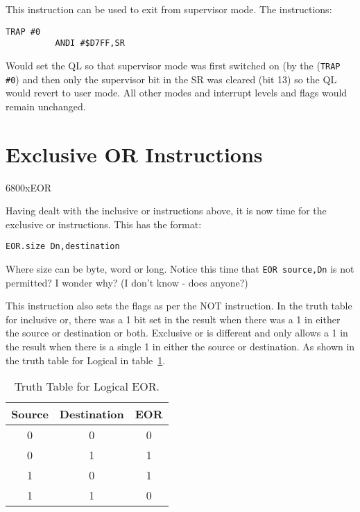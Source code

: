 This instruction can be used to exit from supervisor mode. The
    instructions:

\begin{lstlisting}[firstnumber=1,]
          TRAP #0
          ANDI #$D7FF,SR
\end{lstlisting}

Would set the QL so that supervisor mode was first switched on (by
    the (\lstinline{TRAP #0}) and then only the supervisor bit in the SR was cleared (bit
    13) so the QL would revert to user mode. All other modes and interrupt
    levels and flags would remain unchanged.

\section{Exclusive OR Instructions}\mc6800x{EOR}
\label{ch4-eor}%

Having dealt with the inclusive or instructions above, it is now
    time for the exclusive or instructions. This has the format:

\begin{lstlisting}[firstnumber=1,]
          EOR.size Dn,destination
\end{lstlisting}

Where size can be byte, word or long. Notice this time that \lstinline{EOR source,Dn} is not permitted? I wonder why? (I don't know -{} does anyone?)

This instruction also sets the flags as per the NOT instruction. In
    the truth table for inclusive or, there was a 1 bit set in the result when
    there was a 1 in either the source or destination or both. Exclusive or is
    different and only allows a 1 in the result when there is a single 1 in
    either the source or destination. As shown in the truth table for Logical  in table~\ref{tab:TruthTableForLogicalEOR}.

\begin{table}[h]
\centering
\begin{tabular}{cc|c}

Source & Destination & EOR\\ \hline
0 & 0 & 0 \\
0 & 1 & 1 \\
1 & 0 & 1 \\
1 & 1 & 0

\end{tabular}
\caption{Truth Table for Logical EOR.}
\label{tab:TruthTableForLogicalEOR}
\end{table}

